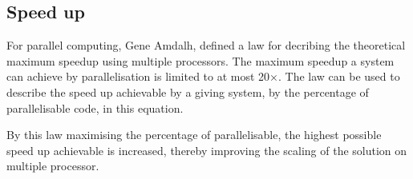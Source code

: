 \subsection{Speed up}
\label{sup}
  For parallel computing, Gene Amdalh, defined a law for decribing the theoretical maximum speedup using multiple processors. The maximum speedup a system can achieve by parallelisation is limited to at most 20×.
  The law can be used to describe the speed up achievable by a giving system, by the percentage of parallelisable code, in this equation.

  By this law maximising the percentage of parallelisable, the highest possible speed up achievable is increased, thereby improving the scaling of the solution on multiple processor.
